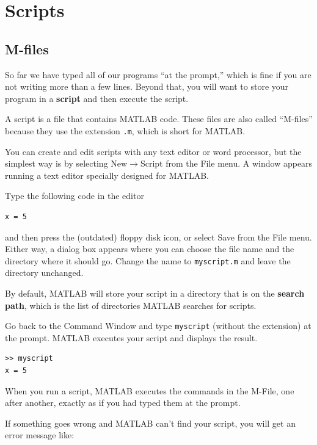 \documentclass[
]{book}
\begin{document}
\chapter{Scripts}

\section{M-files}
\label{sect:M-files}

So far we have typed all of our programs ``at the prompt,'' which is
fine if you are not writing more than a few lines.  Beyond that,
you will want to store your program in a {\bf script} and then
execute the script.

A script is a file that contains MATLAB code.  These files are
also called ``M-files'' because they use the extension {\tt .m},
which is short for MATLAB.

You can create and edit
scripts with any text editor or word processor, but the simplest way
is by selecting {\sf New}$\rightarrow${\sf Script} from the {\sf File}
menu.  A window appears running a text editor specially designed for
MATLAB.

Type the following code in the editor

\begin{verbatim}
x = 5
\end{verbatim}

and then press the (outdated) floppy disk icon, or select {\sf Save}
from the {\sf File} menu.  Either way, a dialog box appears where you
can choose the file name and the directory where it should go.  Change
the name to {\tt myscript.m} and leave the directory unchanged.

By default, MATLAB will store your script in a directory that is on
the {\bf search path}, which is the list of directories MATLAB
searches for scripts.

Go back to the Command Window and type {\tt myscript} (without the
extension) at the prompt.  MATLAB executes your script and displays
the result.

\begin{verbatim}
>> myscript
x = 5
\end{verbatim}

When you run a script, MATLAB executes the commands in the M-File, one
after another, exactly as if you had typed them at the prompt.

If something goes wrong and MATLAB can't find your script, you will
get an error message like:
\end{document}
